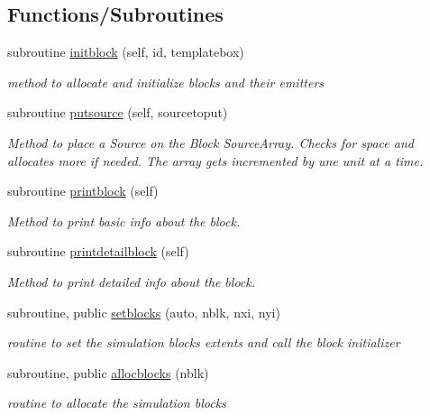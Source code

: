 \subsection*{Functions/\+Subroutines}
\begin{DoxyCompactItemize}
\item 
subroutine \mbox{\hyperlink{namespaceblocks__mod_a534ca69b17b6f54ee07f995b02feff39}{initblock}} (self, id, templatebox)
\begin{DoxyCompactList}\small\item\em method to allocate and initialize blocks and their emitters \end{DoxyCompactList}\item 
subroutine \mbox{\hyperlink{namespaceblocks__mod_a5d11f4958d950c7f436c040bc4133ea0}{putsource}} (self, sourcetoput)
\begin{DoxyCompactList}\small\item\em Method to place a Source on the Block Source\+Array. Checks for space and allocates more if needed. The array gets incremented by une unit at a time. \end{DoxyCompactList}\item 
subroutine \mbox{\hyperlink{namespaceblocks__mod_a6eab8b323cb15dcecb5c6b0c31b4e246}{printblock}} (self)
\begin{DoxyCompactList}\small\item\em Method to print basic info about the block. \end{DoxyCompactList}\item 
subroutine \mbox{\hyperlink{namespaceblocks__mod_a10f356706988c45a255922fe70851488}{printdetailblock}} (self)
\begin{DoxyCompactList}\small\item\em Method to print detailed info about the block. \end{DoxyCompactList}\item 
subroutine, public \mbox{\hyperlink{namespaceblocks__mod_a8f5a5d9e6cfd16cfd1b179092a204696}{setblocks}} (auto, nblk, nxi, nyi)
\begin{DoxyCompactList}\small\item\em routine to set the simulation blocks extents and call the block initializer \end{DoxyCompactList}\item 
subroutine, public \mbox{\hyperlink{namespaceblocks__mod_a639beb0fee2290d46353f4b4702d6711}{allocblocks}} (nblk)
\begin{DoxyCompactList}\small\item\em routine to allocate the simulation blocks \end{DoxyCompactList}\end{DoxyCompactItemize}
